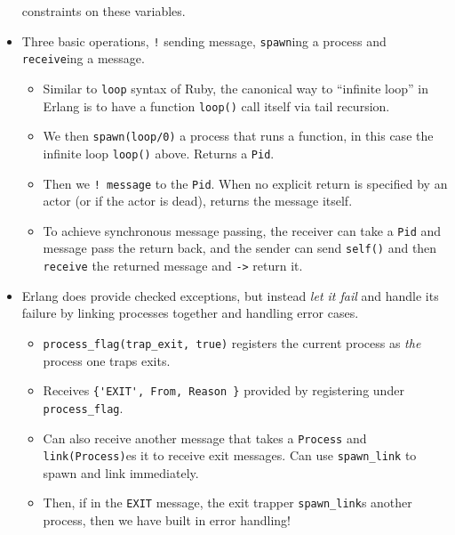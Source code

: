 \documentclass[10pt]{article}
\begin{document}
\begin{itemize}
        constraints on these variables.
    \item Three basic operations, \lstinline{!} sending message,
        \lstinline{spawn}ing a process and \lstinline{receive}ing a message.
        \begin{itemize}
            \item Similar to \lstinline{loop} syntax of Ruby, the canonical way
                to ``infinite loop'' in Erlang is to have a function
                \lstinline{loop()} call itself via tail recursion.
            \item We then \lstinline{spawn(loop/0)} a process that runs a
                function, in this case the infinite loop \lstinline{loop()}
                above. Returns a \lstinline{Pid}.
            \item Then we \lstinline{! message} to the \lstinline{Pid}. When no
                explicit return is specified by an actor (or if the actor is
                dead), returns the message itself.
            \item To achieve synchronous message passing, the receiver can take
                a \lstinline{Pid} and message pass the return back, and the
                sender can send \lstinline{self()} and then \lstinline{receive}
                the returned message and \lstinline{->} return it.
        \end{itemize}
    \item Erlang does provide checked exceptions, but instead \emph{let it
        fail} and handle its failure by linking processes together and handling
        error cases.
        \begin{itemize}
            \item \lstinline{process_flag(trap_exit, true)} registers the
                current process as \emph{the} process one traps exits.
            \item Receives \lstinline${'EXIT', From, Reason }$ provided by
                registering under \lstinline{process_flag}.
            \item Can also receive another message that takes a
                \lstinline{Process} and \lstinline{link(Process)}es it to
                receive exit messages. Can use \lstinline{spawn_link} to spawn
                and link immediately.
            \item Then, if in the \lstinline{EXIT} message, the exit trapper
                \lstinline{spawn_link}s another process, then we have built in
                error handling!
        \end{itemize}

\end{itemize}
\end{document}

